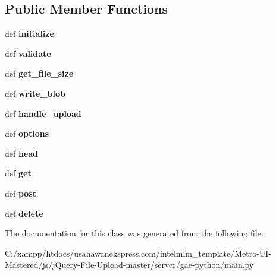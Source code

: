 \subsection*{Public Member Functions}
\begin{DoxyCompactItemize}
\item 
\hypertarget{classmain_1_1_upload_handler_a3d5912674f655d309d5f51470b7cdbc7}{def {\bfseries initialize}}\label{classmain_1_1_upload_handler_a3d5912674f655d309d5f51470b7cdbc7}

\item 
\hypertarget{classmain_1_1_upload_handler_a8f3dc5c8aaf85c281c2f52cda259aa56}{def {\bfseries validate}}\label{classmain_1_1_upload_handler_a8f3dc5c8aaf85c281c2f52cda259aa56}

\item 
\hypertarget{classmain_1_1_upload_handler_a67b4a18951c6c332465844033139b9da}{def {\bfseries get\-\_\-file\-\_\-size}}\label{classmain_1_1_upload_handler_a67b4a18951c6c332465844033139b9da}

\item 
\hypertarget{classmain_1_1_upload_handler_a0546369a59e165464340761194283d81}{def {\bfseries write\-\_\-blob}}\label{classmain_1_1_upload_handler_a0546369a59e165464340761194283d81}

\item 
\hypertarget{classmain_1_1_upload_handler_a84519391c849d30aa6020c8abd24f166}{def {\bfseries handle\-\_\-upload}}\label{classmain_1_1_upload_handler_a84519391c849d30aa6020c8abd24f166}

\item 
\hypertarget{classmain_1_1_upload_handler_a9eba36f181fad41a708f8b7658b2b173}{def {\bfseries options}}\label{classmain_1_1_upload_handler_a9eba36f181fad41a708f8b7658b2b173}

\item 
\hypertarget{classmain_1_1_upload_handler_a6ffb8c9775dd06f2a95c5be870862051}{def {\bfseries head}}\label{classmain_1_1_upload_handler_a6ffb8c9775dd06f2a95c5be870862051}

\item 
\hypertarget{classmain_1_1_upload_handler_a444a1328efb32d5d9d2dcb2efe855d3b}{def {\bfseries get}}\label{classmain_1_1_upload_handler_a444a1328efb32d5d9d2dcb2efe855d3b}

\item 
\hypertarget{classmain_1_1_upload_handler_a49eef07c2e643292b02accabc4f0c182}{def {\bfseries post}}\label{classmain_1_1_upload_handler_a49eef07c2e643292b02accabc4f0c182}

\item 
\hypertarget{classmain_1_1_upload_handler_ab48bde70a0927a83d62464cb0627c34b}{def {\bfseries delete}}\label{classmain_1_1_upload_handler_ab48bde70a0927a83d62464cb0627c34b}

\end{DoxyCompactItemize}


The documentation for this class was generated from the following file\-:\begin{DoxyCompactItemize}
\item 
C\-:/xampp/htdocs/usahawanekspress.\-com/intelmlm\-\_\-template/\-Metro-\/\-U\-I-\/\-Mastered/js/j\-Query-\/\-File-\/\-Upload-\/master/server/gae-\/python/main.\-py\end{DoxyCompactItemize}
